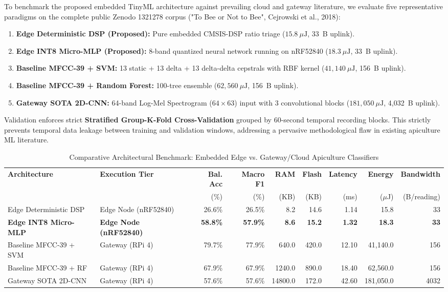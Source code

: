 \documentclass[12pt,a4paper]{article}
\begin{document}
To benchmark the proposed embedded TinyML architecture against prevailing cloud and gateway literature, we evaluate five representative paradigms on the complete public Zenodo 1321278 corpus ("To Bee or Not to Bee", Cejrowski et al., 2018):
\begin{enumerate}[leftmargin=1.5em]
    \item \textbf{Edge Deterministic DSP (Proposed):} Pure embedded CMSIS-DSP ratio triage ($15.8~\mu\text{J}$, 33~B uplink).
    \item \textbf{Edge INT8 Micro-MLP (Proposed):} 8-band quantized neural network running on nRF52840 ($18.3~\mu\text{J}$, 33~B uplink).
    \item \textbf{Baseline MFCC-39 + SVM:} 13 static + 13 delta + 13 delta-delta cepstrals with RBF kernel ($41,140~\mu\text{J}$, 156~B uplink).
    \item \textbf{Baseline MFCC-39 + Random Forest:} 100-tree ensemble ($62,560~\mu\text{J}$, 156~B uplink).
    \item \textbf{Gateway SOTA 2D-CNN:} 64-band Log-Mel Spectrogram ($64 \times 63$) input with 3 convolutional blocks ($181,050~\mu\text{J}$, 4,032~B uplink).
\end{enumerate}

Validation enforces strict \textbf{Stratified Group-K-Fold Cross-Validation} grouped by 60-second temporal recording blocks. This strictly prevents temporal data leakage between training and validation windows, addressing a pervasive methodological flaw in existing apiculture ML literature.

\begin{table}[t]
\centering
\caption{Comparative Architectural Benchmark: Embedded Edge vs. Gateway/Cloud Apiculture Classifiers}
\label{tab:acoustic_pareto}
\begin{tabular}{l l r r r r r r r}
\toprule
\textbf{Architecture} & \textbf{Execution Tier} & \textbf{Bal. Acc} & \textbf{Macro F1} & \textbf{RAM} & \textbf{Flash} & \textbf{Latency} & \textbf{Energy} & \textbf{Bandwidth} \\
 & & (\%) & (\%) & (KB) & (KB) & (ms) & ($\mu$J) & (B/reading) \\
\midrule
Edge Deterministic DSP & Edge Node (nRF52840) & 26.6\% & 26.5\% & 8.2 & 14.6 & 1.14 & 15.8 & 33 \\
\textbf{Edge INT8 Micro-MLP} & \textbf{Edge Node (nRF52840)} & \textbf{58.8\%} & \textbf{57.9\%} & \textbf{8.6} & \textbf{15.2} & \textbf{1.32} & \textbf{18.3} & \textbf{33} \\
Baseline MFCC-39 + SVM & Gateway (RPi 4) & 79.7\% & 77.9\% & 640.0 & 420.0 & 12.10 & 41,140.0 & 156 \\
Baseline MFCC-39 + RF & Gateway (RPi 4) & 67.9\% & 67.9\% & 1240.0 & 890.0 & 18.40 & 62,560.0 & 156 \\
Gateway SOTA 2D-CNN & Gateway (RPi 4) & 57.6\% & 57.6\% & 14800.0 & 172.0 & 42.60 & 181,050.0 & 4032 \\
\bottomrule
\end{tabular}
\end{table}
\end{document}
